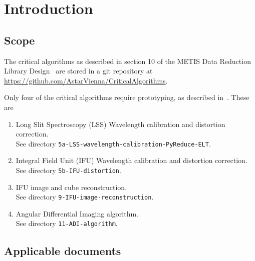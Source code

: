 \documentclass[11pt,oneside,a4paper]{article}
\newcommand{\CODE}[1]{\lstinline[]!#1!}
\begin{document}




\section{Introduction}
\label{sec:intro}

\subsection{Scope}
\label{ssec:scope}
The critical algorithms as described in section 10 of the METIS Data Reduction Library Design~\cite{DRLD} are stored in a git repository at \url{https://github.com/AstarVienna/CriticalAlgorithms}.

Only four of the critical algorithms require prototyping, as described in~\cite{DRLD}.
These are
\begin{enumerate}
    \item[5a.] Long Slit Spectroscopy (LSS) Wavelength calibration and distortion correction.\\
        See directory \CODE{5a-LSS-wavelength-calibration-PyReduce-ELT}.
    \item[5b.] Integral Field Unit (IFU) Wavelength calibration and distortion correction.\\
        See directory \CODE{5b-IFU-distortion}.
    \item[9.] IFU image and cube reconstruction.\\
        See directory \CODE{9-IFU-image-reconstruction}.
    \item[11.] Angular Differential Imaging algorithm.\\
        See directory \CODE{11-ADI-algorithm}.
\end{enumerate}

\subsection{Applicable documents}
\label{ssec:ad}
\begin{refcontext}[labelprefix=AD]
  \printbibliography[keyword=applicable, heading=none]
\end{refcontext}


%
\end{document}
